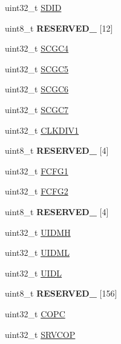 \begin{DoxyCompactItemize}
\item 
uint32\+\_\+t \hyperlink{struct_s_i_m___mem_map_a536b8d3e185149c51e88387350e20fb3}{S\+D\+ID}
\item 
\mbox{\label{struct_s_i_m___mem_map_a5a6fab98427eb3ae20ebd13a740d55ad}} 
uint8\+\_\+t {\bfseries R\+E\+S\+E\+R\+V\+E\+D\+\_} \mbox{[}12\mbox{]}
\item 
uint32\+\_\+t \hyperlink{struct_s_i_m___mem_map_a96c123ab70356a131990c9ae3812834e}{S\+C\+G\+C4}
\item 
uint32\+\_\+t \hyperlink{struct_s_i_m___mem_map_ae9d560d3862eb171c739acaf92daa8aa}{S\+C\+G\+C5}
\item 
uint32\+\_\+t \hyperlink{struct_s_i_m___mem_map_ad40dd833ac37056f5341b692039a5f10}{S\+C\+G\+C6}
\item 
uint32\+\_\+t \hyperlink{struct_s_i_m___mem_map_aa35362a8c756eedb82b8cf00f98c43da}{S\+C\+G\+C7}
\item 
uint32\+\_\+t \hyperlink{struct_s_i_m___mem_map_afa315c39ebd4ef380b7f8d67a88d4f82}{C\+L\+K\+D\+I\+V1}
\item 
\mbox{\label{struct_s_i_m___mem_map_ad7e1d9ac03bc795d98c49ee8574bfedc}} 
uint8\+\_\+t {\bfseries R\+E\+S\+E\+R\+V\+E\+D\+\_} \mbox{[}4\mbox{]}
\item 
uint32\+\_\+t \hyperlink{struct_s_i_m___mem_map_a2b78edd16e6d046eb3399182216bf816}{F\+C\+F\+G1}
\item 
uint32\+\_\+t \hyperlink{struct_s_i_m___mem_map_afd105923b2815e01119a5bc195ceebd6}{F\+C\+F\+G2}
\item 
\mbox{\label{struct_s_i_m___mem_map_a93af4e6410ab634b2377389fc500c73a}} 
uint8\+\_\+t {\bfseries R\+E\+S\+E\+R\+V\+E\+D\+\_} \mbox{[}4\mbox{]}
\item 
uint32\+\_\+t \hyperlink{struct_s_i_m___mem_map_af4fb6d5bc3fa71f9c905570d87a2e93f}{U\+I\+D\+MH}
\item 
uint32\+\_\+t \hyperlink{struct_s_i_m___mem_map_a51e871d8ac13db8b605b6ec1b3292be4}{U\+I\+D\+ML}
\item 
uint32\+\_\+t \hyperlink{struct_s_i_m___mem_map_ac23a694afa8d84e55fc43ff0c0ec1b29}{U\+I\+DL}
\item 
\mbox{\label{struct_s_i_m___mem_map_aea5a0db6a5b82760418e4529895541da}} 
uint8\+\_\+t {\bfseries R\+E\+S\+E\+R\+V\+E\+D\+\_} \mbox{[}156\mbox{]}
\item 
uint32\+\_\+t \hyperlink{struct_s_i_m___mem_map_adb743819184b25914372606a57d6e416}{C\+O\+PC}
\item 
uint32\+\_\+t \hyperlink{struct_s_i_m___mem_map_aa6f9efca2d70bfed14630de650d77ba8}{S\+R\+V\+C\+OP}
\end{DoxyCompactItemize}



